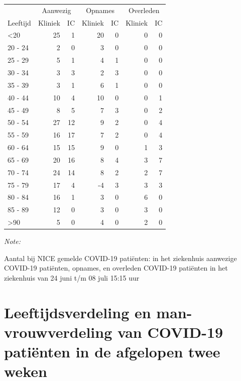 \documentclass[
  english,
  man,floatsintext]{apa6}
\begin{document}
\begin{table}
\centering\begingroup\fontsize{10}{12}\selectfont

\begin{threeparttable}
\begin{tabular}{lrrrrrr}
\toprule
\multicolumn{1}{c}{ } & \multicolumn{2}{c}{Aanwezig} & \multicolumn{2}{c}{Opnames} & \multicolumn{2}{c}{Overleden} \\
\cmidrule(l{3pt}r{3pt}){2-3} \cmidrule(l{3pt}r{3pt}){4-5} \cmidrule(l{3pt}r{3pt}){6-7}
Leeftijd & Kliniek & IC & Kliniek & IC & Kliniek & IC\\
\midrule
<20 & 25 & 1 & 20 & 0 & 0 & 0\\
20 - 24 & 2 & 0 & 3 & 0 & 0 & 0\\
25 - 29 & 5 & 1 & 4 & 1 & 0 & 0\\
30 - 34 & 3 & 3 & 2 & 3 & 0 & 0\\
35 - 39 & 3 & 1 & 6 & 1 & 0 & 0\\
40 - 44 & 10 & 4 & 10 & 0 & 0 & 1\\
45 - 49 & 8 & 5 & 7 & 3 & 0 & 2\\
50 - 54 & 27 & 12 & 9 & 2 & 0 & 4\\
55 - 59 & 16 & 17 & 7 & 2 & 0 & 4\\
60 - 64 & 15 & 15 & 9 & 0 & 1 & 3\\
65 - 69 & 20 & 16 & 8 & 4 & 3 & 7\\
70 - 74 & 24 & 14 & 8 & 2 & 2 & 7\\
75 - 79 & 17 & 4 & -4 & 3 & 3 & 3\\
80 - 84 & 16 & 1 & 3 & 0 & 6 & 0\\
85 - 89 & 12 & 0 & 3 & 0 & 3 & 0\\
>90 & 5 & 0 & 4 & 0 & 2 & 0\\
\bottomrule
\end{tabular}
\begin{tablenotes}
\item \textit{Note: } 
\item Aantal bij NICE gemelde COVID-19 patiënten: in het ziekenhuis aanwezige COVID-19 patiënten, opnames, en overleden COVID-19 patiënten in het ziekenhuis van 24 juni t/m 08 juli 15:15 uur
\end{tablenotes}
\end{threeparttable}
\endgroup{}
\end{table}

\newpage

\hypertarget{leeftijdsverdeling-en-man-vrouwverdeling-van-covid-19-patiuxebnten-in-de-afgelopen-twee-weken}{%
\section{Leeftijdsverdeling en man-vrouwverdeling van COVID-19 patiënten in de afgelopen twee weken}\label{leeftijdsverdeling-en-man-vrouwverdeling-van-covid-19-patiuxebnten-in-de-afgelopen-twee-weken}}
\end{document}
